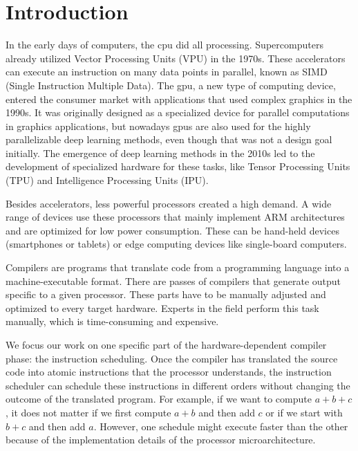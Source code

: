\chapter{Introduction}
In the early days of computers, the \ac{cpu} did all processing.
Supercomputers already utilized Vector Processing Units (VPU) in the 1970s.
These accelerators can execute an instruction on many data points in parallel, known as SIMD (Single Instruction Multiple Data).
The \ac{gpu}, a new type of computing device, entered the consumer market with applications that used complex graphics in the 1990s.
It was originally designed as a specialized device for parallel computations in graphics applications, but nowadays \acp{gpu} are also used for the highly parallelizable deep learning methods, even though that was not a design goal initially.
The emergence of deep learning methods in the 2010s led to the development of specialized hardware for these tasks, like Tensor Processing Units (TPU) and Intelligence Processing Units (IPU).

Besides accelerators, less powerful processors created a high demand.
A wide range of devices use these processors that mainly implement ARM architectures and are optimized for low power consumption.
These can be hand-held devices (\eg smartphones or tablets) or edge computing devices like single-board computers.

Compilers are programs that translate code from a programming language into a machine-executable format.
There are passes of compilers that generate output specific to a given processor.
These parts have to be manually adjusted and optimized to every target hardware.
Experts in the field perform this task manually, which is time-consuming and expensive.

We focus our work on one specific part of the hardware-dependent compiler phase: the instruction scheduling.
Once the compiler has translated the source code into atomic instructions that the processor understands, the instruction scheduler can schedule these instructions in different orders without changing the outcome of the translated program.
For example, if we want to compute $a+b+c$, it does not matter if we first compute $a+b$ and then add $c$ or if we start with $b+c$ and then add $a$.
However, one schedule might execute faster than the other because of the implementation details of the processor microarchitecture.

